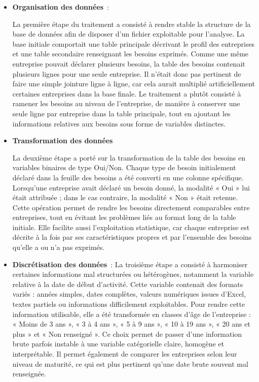 \documentclass[12pt, a4paper, oneside]{report}
\begin{document}
	\begin{itemize}
		\item \textbf{Organisation des données} :
		
		
		La première étape du traitement a consisté à rendre stable la structure de la base de données afin de disposer d’un fichier exploitable pour l’analyse. La base initiale comportait une table principale décrivant le profil des entreprises et une table secondaire renseignant les besoins exprimés. Comme une même entreprise pouvait déclarer plusieurs besoins, la table des besoins contenait plusieurs lignes pour une seule entreprise. Il n’était donc pas pertinent de faire une simple jointure ligne à ligne, car cela aurait multiplié artificiellement certaines entreprises dans la base finale. Le traitement a plutôt consisté à ramener les besoins au niveau de l’entreprise, de manière à conserver une seule ligne par entreprise dans la table principale, tout en ajoutant les informations relatives aux besoins sous forme de variables distinctes.\\
		
		\item \textbf{Transformation des données}
		
		La deuxième étape a porté sur la transformation de la table des besoins en variables binaires de type Oui/Non. Chaque type de besoin initialement déclaré dans la feuille des besoins a été converti en une colonne spécifique. Lorsqu’une entreprise avait déclaré un besoin donné, la modalité « Oui » lui était attribuée ; dans le cas contraire, la modalité « Non » était retenue. Cette opération permet de rendre les besoins directement comparables entre entreprises, tout en évitant les problèmes liés au format long de la table initiale. Elle facilite aussi l’exploitation statistique, car chaque entreprise est décrite à la fois par ses caractéristiques propres et par l’ensemble des besoins qu’elle a ou n’a pas exprimés.\\
		
		\item \textbf{Discrétisation des données} :
		La troisième étape a consisté à harmoniser certaines informations mal structurées ou hétérogènes, notamment la variable relative à la date de début d’activité. Cette variable contenait des formats variés : années simples, dates complètes, valeurs numériques issues d’Excel, textes partiels ou informations difficilement exploitables. Pour rendre cette information utilisable, elle a été transformée en classes d’âge de l’entreprise : « Moins de 3 ans », « 3 à 4 ans », « 5 à 9 ans », « 10 à 19 ans », « 20 ans et plus » et « Non renseigné ». Ce choix permet de passer d’une information brute parfois instable à une variable catégorielle claire, homogène et interprétable. Il permet également de comparer les entreprises selon leur niveau de maturité, ce qui est plus pertinent qu’une date brute souvent mal renseignée.\\
		

\end{itemize}
\end{document}
